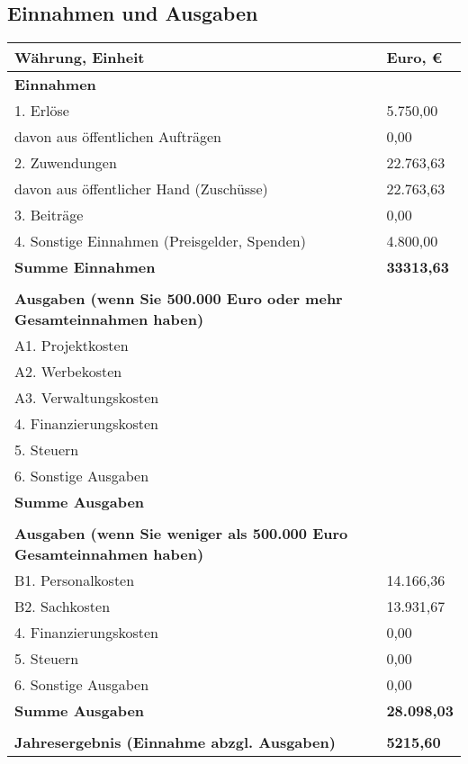\documentclass[12pt, a4paper]{article} %
\begin{document}
\subsection{Einnahmen und Ausgaben}

\begin{table}[!h]
\centering
\label{table1}
\begin{tabular}{|p{6cm}|p{8 cm}|}
\hline
Währung, Einheit                    & Euro, \euro{}\\ \hline
\textbf{Einnahmen}                  & \\ \hline
1. Erlöse                    & 5.750,00\\ \hline
davon aus öffentlichen Aufträgen   & 0,00\\ \hline
2. Zuwendungen                     & 22.763,63\\ \hline
davon aus öffentlicher Hand (Zuschüsse)                    & 22.763,63\\ \hline
3. Beiträge    & 0,00\\ \hline
4. Sonstige Einnahmen (Preisgelder, Spenden)                     & 4.800,00\\ \hline
\textbf{Summe Einnahmen}                 & \textbf{33313,63}\\ \hline
& \\ \hline
\textbf{Ausgaben (wenn Sie 500.000 Euro oder mehr Gesamteinnahmen haben)}&   \\ \hline
A1. Projektkosten
            & \\ \hline
A2. Werbekosten           & \\ \hline
A3. Verwaltungskosten              & \\ \hline
4. Finanzierungskosten             & \\ \hline
5. Steuern             & \\ \hline
6. Sonstige Ausgaben             & \\ \hline
\textbf{Summe Ausgaben}                 & \\ \hline

& \\ \hline
\textbf{ 
Ausgaben (wenn Sie weniger als 500.000 Euro Gesamteinnahmen haben)}&   \\ \hline
B1. Personalkosten
            & 14.166,36\\ \hline
B2. Sachkosten           & 13.931,67\\ \hline
4. Finanzierungskosten              & 0,00\\ \hline
5. Steuern             & 0,00\\ \hline
6. Sonstige Ausgaben             & 0,00\\ \hline
\textbf{Summe Ausgaben}                 & \textbf{28.098,03}\\ \hline

& \\ \hline
\textbf{ 
Jahresergebnis (Einnahme abzgl. Ausgaben)}& \textbf{5215,60}  \\ \hline

\end{tabular}
\end{table}
\end{document}
